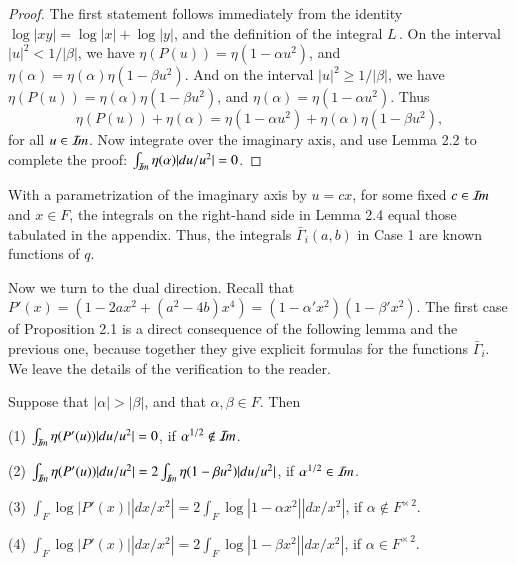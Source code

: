 \documentclass{amsart}
\newcommand\Imm{{\mathcal I\hskip-.2em m}}
\newcommand\LOG{{L\,}}
\newcommand\bGamma{\bar\Gamma}
\newenvironment{cthm}[1]
  {\renewcommand\thethm{\bf #1}\thm}
  {\endthm}
\begin{document}
\bigskip
\begin{proof}  The first statement follows immediately from the identity
$\log|xy| = \log|x|+\log|y|$, and the definition of the integral $\LOG$.
On the interval $|u|^2 < 1/|\beta|$, we have $\eta(P(u)) = \eta(1-\alpha u^2)$,
and $\eta(\alpha)=\eta(\alpha)\eta(1-\beta u^2)$.  
And on the interval
$|u|^2 \ge 1/|\beta|$, we have $\eta(P(u)) = \eta(\alpha)\eta(1-\beta u^2)$,
and $\eta(\alpha)=\eta(1-\alpha u^2)$.  Thus 
$$\eta(P(u)) + \eta(\alpha) = \eta(1-\alpha u^2) + \eta(\alpha)\eta(1-\beta u^2),$$
for all $u\in \Imm$.  Now integrate over the imaginary axis, and use Lemma 2.2
to complete the proof: $\int_{\Imm} \eta(\alpha) |du/u^2|=0$.
\end{proof}

With a parametrization of the imaginary axis by $u = cx$, for some 
fixed $c\in \Imm$
and $x\in F$, the integrals on the right-hand side 
in Lemma 2.4 equal those tabulated
in the appendix.  Thus, the integrals $\bGamma_i(a,b)$ in Case 1
are known functions
of $q$.

Now we turn to the dual direction.  Recall that $P'(x) = (1-2ax^2+(a^2-4b)x^4)
= (1-\alpha'x^2)(1-\beta'x^2)$.  The first case of Proposition 2.1
is a direct 
consequence of the following lemma and the previous one, because
together they give explicit formulas for the functions $\bGamma_i$.
We leave the details of
the verification to the reader.

\bigskip
\noindent
\begin{cthm}{Lemma 2.5}  Suppose that $|\alpha|>|\beta|$, and that $\alpha,\beta\in F$.
Then
\parskip=0pt

(1)  $\int_{\Imm}\eta(P'(u)) |du/u^2| = 0$, if $\alpha^{1/2}\not\in\Imm$.

(2)  $\int_{\Imm}\eta(P'(u)) |du/u^2| = 2\int_{\Imm}\eta(1-\beta u^2)|du/u^2|$,
       if $\alpha^{1/2}\in \Imm$.

(3)  $\int_{F}\log|P'(x)| |dx/x^2| = 2\int_{F}
        \log|1-\alpha x^2| |dx/x^2|$,
       if $\alpha\not\in F^{\times\,2}$.

(4) $\int_{F}\log|P'(x)| |dx/x^2| = 2\int_{F}\log|1-\beta x^2|
     |dx/x^2|$, if $\alpha\in F^{\times\,2}$.
\end{cthm}
\end{document}
